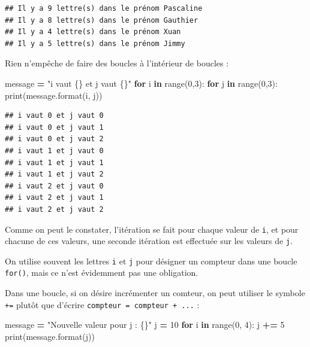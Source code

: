 \documentclass[12pt,]{book}
\newenvironment{Shaded}{\begin{snugshade}}{\end{snugshade}}
\newcommand{\KeywordTok}[1]{\textcolor[rgb]{0.13,0.29,0.53}{\textbf{#1}}}
\newcommand{\DecValTok}[1]{\textcolor[rgb]{0.00,0.00,0.81}{#1}}
\newcommand{\SpecialCharTok}[1]{\textcolor[rgb]{0.00,0.00,0.00}{#1}}
\newcommand{\StringTok}[1]{\textcolor[rgb]{0.31,0.60,0.02}{#1}}
\newcommand{\ControlFlowTok}[1]{\textcolor[rgb]{0.13,0.29,0.53}{\textbf{#1}}}
\newcommand{\OperatorTok}[1]{\textcolor[rgb]{0.81,0.36,0.00}{\textbf{#1}}}
\newcommand{\BuiltInTok}[1]{#1}
\newcommand{\NormalTok}[1]{#1}
\numberwithin{equation}{section}
\numberwithin{countremarque}{section}
\let\BeginKnitrBlock\begin \let\EndKnitrBlock\end
\begin{document}
\begin{lstlisting}
## Il y a 9 lettre(s) dans le prénom Pascaline
## Il y a 8 lettre(s) dans le prénom Gauthier
## Il y a 4 lettre(s) dans le prénom Xuan
## Il y a 5 lettre(s) dans le prénom Jimmy
\end{lstlisting}

Rien n'empêche de faire des boucles à l'intérieur de boucles :

\begin{Shaded}
\begin{Highlighting}[]
\NormalTok{message }\OperatorTok{=} \StringTok{"i vaut }\SpecialCharTok{\{\}}\StringTok{ et j vaut }\SpecialCharTok{\{\}}\StringTok{"}
\ControlFlowTok{for}\NormalTok{ i }\KeywordTok{in} \BuiltInTok{range}\NormalTok{(}\DecValTok{0}\NormalTok{,}\DecValTok{3}\NormalTok{):}
    \ControlFlowTok{for}\NormalTok{ j }\KeywordTok{in} \BuiltInTok{range}\NormalTok{(}\DecValTok{0}\NormalTok{,}\DecValTok{3}\NormalTok{):}
        \BuiltInTok{print}\NormalTok{(message.}\BuiltInTok{format}\NormalTok{(i, j))}
\end{Highlighting}
\end{Shaded}

\begin{lstlisting}
## i vaut 0 et j vaut 0
## i vaut 0 et j vaut 1
## i vaut 0 et j vaut 2
## i vaut 1 et j vaut 0
## i vaut 1 et j vaut 1
## i vaut 1 et j vaut 2
## i vaut 2 et j vaut 0
## i vaut 2 et j vaut 1
## i vaut 2 et j vaut 2
\end{lstlisting}

Comme on peut le constater, l'itération se fait pour chaque valeur de
\texttt{i}, et pour chacune de ces valeurs, une seconde itération est
effectuée sur les valeurs de \texttt{j}.

\BeginKnitrBlock{remarque}
On utilise souvent les lettres \texttt{i} et \texttt{j} pour désigner un
compteur dans une boucle \texttt{for()}, mais ce n'est évidemment pas
une obligation.
\EndKnitrBlock{remarque}

Dans une boucle, si on désire incrémenter un comteur, on peut utiliser
le symbole \texttt{+=} plutôt que d'écrire
\texttt{compteur\ =\ compteur\ +\ ...} :

\begin{Shaded}
\begin{Highlighting}[]
\NormalTok{message }\OperatorTok{=} \StringTok{"Nouvelle valeur pour j : }\SpecialCharTok{\{\}}\StringTok{"}
\NormalTok{j }\OperatorTok{=} \DecValTok{10}
\ControlFlowTok{for}\NormalTok{ i }\KeywordTok{in} \BuiltInTok{range}\NormalTok{(}\DecValTok{0}\NormalTok{, }\DecValTok{4}\NormalTok{):}
\NormalTok{  j }\OperatorTok{+=} \DecValTok{5}
  \BuiltInTok{print}\NormalTok{(message.}\BuiltInTok{format}\NormalTok{(j))}
  
\end{Highlighting}
\end{Shaded}
\end{document}
